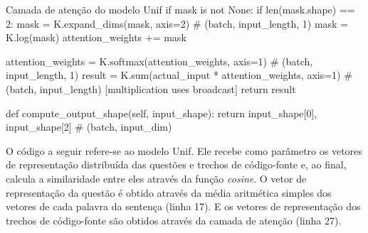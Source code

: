 \begin{mypython-linenumber}{Camada de atenção do modelo Unif}
        if mask is not None:
            if len(mask.shape) == 2:
                mask = K.expand_dims(mask, axis=2)  # (batch, input_length, 1)
            mask = K.log(mask)
            attention_weights += mask

        attention_weights = K.softmax(attention_weights, axis=1)  # (batch, input_length, 1)
        result = K.sum(actual_input * attention_weights, axis=1)  # (batch, input_length)  [multiplication uses broadcast]
        return result

    def compute_output_shape(self, input_shape):
        return input_shape[0], input_shape[2] # (batch, input_dim)
\end{mypython-linenumber}


\vspace{2cm}

O código a seguir refere-se ao modelo Unif. Ele recebe como parâmetro os vetores de representação distribuída das questões e trechos de código-fonte e, ao final, calcula a similaridade entre eles através da função \textit{cosine}. O vetor de representação da questão é obtido através da média aritmética simples dos vetores de cada palavra da sentença (linha 17). E os vetores de representação dos trechos de código-fonte são obtidos através da camada de atenção (linha 27).


